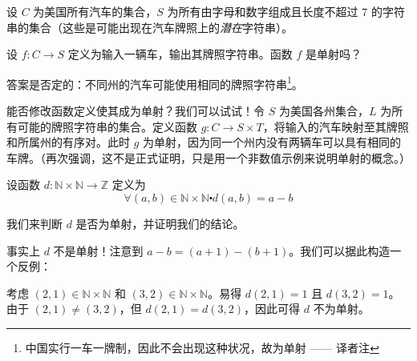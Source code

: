 \begin{example}
    设 $C$ 为美国所有汽车的集合，$S$ 为所有由字母和数字组成且长度不超过 $7$ 的字符串的集合（这些是可能出现在汽车牌照上的\emph{潜在}字符串）。

    设 $f : C \to S$ 定义为输入一辆车，输出其牌照字符串。函数 $f$ 是单射吗？

    答案是否定的：不同州的汽车可能使用相同的牌照字符串\footnote{中国实行一车一牌制，因此不会出现这种状况，故为单射 —— 译者注}。
    
    能否修改函数定义使其成为单射？我们可以试试！令 $S$ 为美国各州集合，$L$ 为所有可能的牌照字符串的集合。定义函数 $g : C \to S \times T$，将输入的汽车映射至其牌照和所属州的有序对。此时 $g$ 为单射，因为同一个州内没有两辆车可以具有相同的车牌。（再次强调，这不是正式证明，只是用一个非数值示例来说明单射的概念。）
\end{example}

\begin{example}
    设函数 $d : \mathbb{N} \times \mathbb{N} \to \mathbb{Z}$ 定义为
    \[\forall (a, b) \in \mathbb{N} \times \mathbb{N} \centerdot d(a, b) = a - b\]

    我们来判断 $d$ 是否为单射，并证明我们的结论。

    事实上 $d$ 不是单射！注意到 $a - b = (a + 1) - (b + 1)$。我们可以据此构造一个反例：

    考虑 $(2, 1) \in \mathbb{N} \times \mathbb{N}$ 和 $(3, 2) \in \mathbb{N} \times \mathbb{N}$。易得 $d(2, 1) = 1$ 且 $d(3, 2) = 1$。由于 $(2, 1) \ne (3, 2)$，但 $d(2, 1) = d(3, 2)$，因此可得 $d$ 不为单射。
\end{example}

